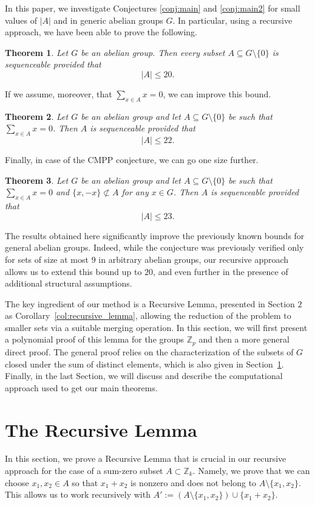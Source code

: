 \documentclass[11pt]{amsart}
\newtheorem{theorem}{Theorem}[section]
\theoremstyle{definition}
\begin{document}
In this paper, we investigate Conjectures \ref{conj:main} and \ref{conj:main2} for small values of $|A|$ and in generic abelian groups $G$. In particular, using a recursive approach, we have been able to prove the following.
\begin{theorem}\label{thm:main}
Let $G$ be an abelian group. Then every subset $A \subseteq G\setminus\{0\}$
is sequenceable provided that
\[
|A| \leq 20.
\]
\end{theorem}
If we assume, moreover, that $\sum_{x\in A}x=0$, we can improve this bound.
\begin{theorem}\label{sumzero}
Let $G$ be an abelian group and let $A \subseteq G\setminus\{0\}$ be such that $\sum_{x\in A}x=0$.
Then $A$ is sequenceable provided that
\[
|A| \leq 22.
\]
\end{theorem}
Finally, in case of the CMPP conjecture, we can go one size further.
\begin{theorem}\label{sumzeroxmx}
Let $G$ be an abelian group and let $A \subseteq G\setminus\{0\}$ be such that $\sum_{x\in A}x=0$ and $\{x,-x\}\not\subset A$ for any $x\in G$.
Then $A$ is sequenceable 
provided that
\[
|A| \leq 23.
\]
\end{theorem}

The results obtained here significantly improve the previously known bounds for general abelian groups. 
Indeed, while the conjecture was previously verified only for sets of size at most $9$ in arbitrary abelian groups, 
our recursive approach allows us to extend this bound up to $20$, and even further in the presence of additional 
structural assumptions. 


The key ingredient of our method is a Recursive Lemma, presented in Section $2$ as Corollary~\ref{col:recursive_lemma}, allowing the reduction of the problem to smaller sets via 
a suitable merging operation. In this section, we will first present a polynomial proof of this lemma for the groups $\mathbb{Z}_p$ and then a more general direct proof. The general proof relies on the characterization of the subsets of $G$ closed under the sum of distinct elements, which is also given in Section~\ref{sec:rec_lemma}. 
Finally, in the last Section, we will discuss and describe the computational approach used to get our main theorems.
\section{The Recursive Lemma} \label{sec:rec_lemma}
In this section, we %
prove a Recursive Lemma that %
is crucial in our recursive approach for the case of a sum-zero subset $A\subset\mathbb{Z}_k$. Namely, we %
prove that we can choose $x_1,x_2\in A$ so that $x_1+x_2$ is nonzero and does not belong to $A\setminus\{x_1,x_2\}$. This allows us to work recursively with $A':=(A\setminus\{x_1,x_2\})\cup \{x_1+x_2\}.$ 
\end{document}
